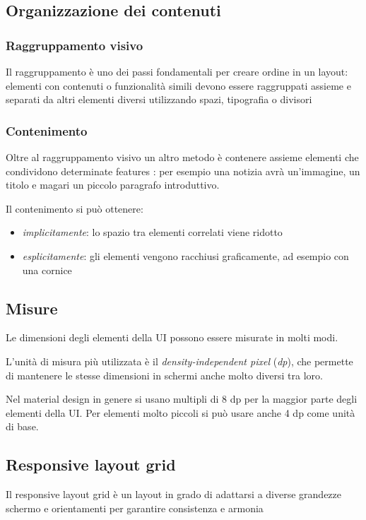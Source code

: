 \documentclass[12pt, a4paper]{report}
\begin{document}
		\subsection{Organizzazione dei contenuti}
			\subsubsection{Raggruppamento visivo}
			Il raggruppamento è uno dei passi fondamentali per creare ordine in un layout: elementi con contenuti o funzionalità simili devono essere raggruppati assieme e separati da altri elementi diversi utilizzando spazi, tipografia o divisori

			\subsubsection{Contenimento}
			Oltre al raggruppamento visivo un altro metodo è contenere assieme elementi che condividono determinate features			\cite{layout_organizzazione}:
			per esempio una notizia avrà un'immagine, un titolo e magari un piccolo paragrafo introduttivo. 
			
			Il contenimento si può ottenere:
			\begin{itemize}
				\item \textit{implicitamente}: lo spazio tra elementi correlati viene ridotto 
    			\item \textit{esplicitamente}: gli elementi vengono racchiusi graficamente, ad esempio con una cornice
			\end{itemize}
			
		\subsection{Misure}
		Le dimensioni degli elementi della UI possono essere misurate in molti modi. 

		L'unità di misura più utilizzata è il \textit{density-independent pixel} (\textit{dp}), che permette di mantenere le stesse dimensioni in schermi anche molto diversi tra loro.

		Nel material design in genere si usano multipli di 8 dp per la maggior parte degli elementi della UI. Per elementi molto piccoli si può usare anche 4 dp come unità di base.

		\subsection{Responsive layout grid}
			Il responsive layout grid è un layout in grado di adattarsi a diverse grandezze schermo e orientamenti per garantire consistenza e armonia \cite{layout_grid}
\end{document}

